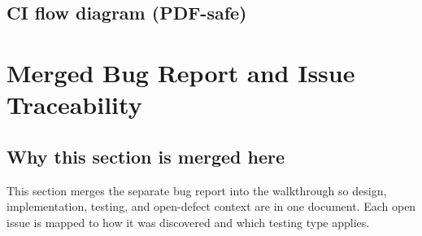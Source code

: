 \documentclass[12pt,a4paper]{article}
\begin{document}
\subsection{CI flow diagram (PDF-safe)}
\begin{center}
\end{center}

\section{Merged Bug Report and Issue Traceability}

\subsection{Why this section is merged here}
This section merges the separate bug report into the walkthrough so design, implementation, testing, and open-defect context are in one document. Each open issue is mapped to how it was discovered and which testing type applies.
\end{document}
